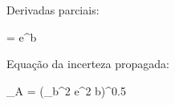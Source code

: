 
Derivadas parciais:

 = e^{b}

Equação da incerteza propagada:

\sigma_A = \left(\sigma_b^{2} e^{2 b}\right)^{0.5}
